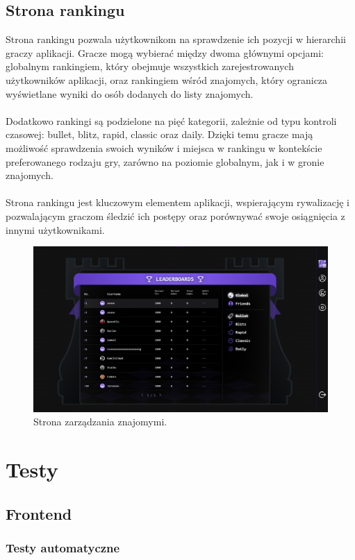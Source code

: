 \documentclass[12pt,a4paper]{article}
\begin{document}
\subsection{Strona rankingu}
Strona rankingu pozwala użytkownikom na sprawdzenie ich pozycji w hierarchii graczy aplikacji. Gracze mogą wybierać między dwoma głównymi opcjami: globalnym rankingiem, który obejmuje wszystkich zarejestrowanych użytkowników aplikacji, oraz rankingiem wśród znajomych, który ogranicza wyświetlane wyniki do osób dodanych do listy znajomych.
\\\\
Dodatkowo rankingi są podzielone na pięć kategorii, zależnie od typu kontroli czasowej: bullet, blitz, rapid, classic oraz daily. Dzięki temu gracze mają możliwość sprawdzenia swoich wyników i miejsca w rankingu w kontekście preferowanego rodzaju gry, zarówno na poziomie globalnym, jak i w gronie znajomych.
\\\\
Strona rankingu jest kluczowym elementem aplikacji, wspierającym rywalizację i pozwalającym graczom śledzić ich postępy oraz porównywać swoje osiągnięcia z innymi użytkownikami.

\begin{figure}[h!]
    \centering
    \includegraphics[width=1\textwidth]{zdj/ins_rank.png}
    \caption{Strona zarządzania znajomymi.}
\end{figure}

\newpage
\section{Testy}
\subsection{Frontend}
\subsubsection{Testy automatyczne}
\end{document}
